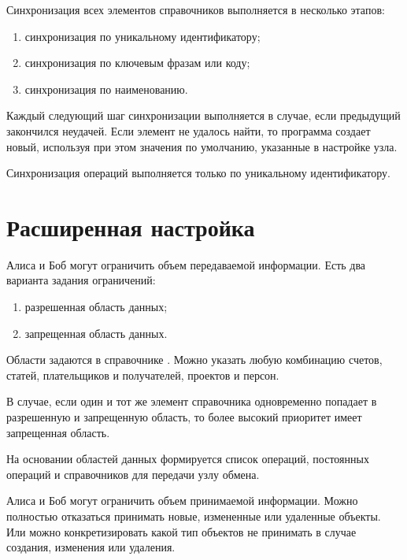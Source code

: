 \documentclass[a4paper,10pt,russian]{sphinxmanual}
\begin{document}
\sphinxAtStartPar
Синхронизация всех элементов справочников выполняется в несколько этапов:
\begin{enumerate}
%
\item {} 
\sphinxAtStartPar
синхронизация по уникальному идентификатору;

\item {} 
\sphinxAtStartPar
синхронизация по ключевым фразам или коду;

\item {} 
\sphinxAtStartPar
синхронизация по наименованию.

\end{enumerate}

\sphinxAtStartPar
Каждый следующий шаг синхронизации выполняется в случае, если предыдущий закончился неудачей. Если элемент
не удалось найти, то программа создает новый, используя при этом значения по умолчанию, указанные в настройке узла.

\sphinxAtStartPar
Синхронизация операций выполняется только по уникальному идентификатору.


\section{Расширенная настройка}
\label{\detokenize{teamwork:id8}}
\sphinxAtStartPar
Алиса и Боб могут ограничить объем передаваемой информации. Есть два варианта задания ограничений:
\begin{enumerate}
%
\item {} 
\sphinxAtStartPar
разрешенная область данных;

\item {} 
\sphinxAtStartPar
запрещенная область данных.

\end{enumerate}

\sphinxAtStartPar
Области задаются в справочнике . Можно указать любую комбинацию счетов, статей, плательщиков и получателей,
проектов и персон.

\sphinxAtStartPar
В случае, если один и тот же элемент справочника одновременно попадает в разрешенную и запрещенную область, то более
высокий приоритет имеет запрещенная область.

\sphinxAtStartPar
На основании областей данных формируется список операций, постоянных операций и справочников для передачи узлу обмена.

\sphinxAtStartPar
Алиса и Боб могут ограничить объем принимаемой информации. Можно полностью отказаться принимать новые, измененные или удаленные объекты.
Или можно конкретизировать какой тип объектов не принимать в случае создания, изменения или удаления.
\end{document}
